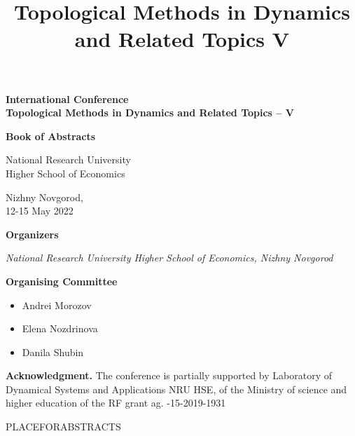 \documentclass[11pt]{combine}
\title{Topological Methods in Dynamics and Related Topics V}
\begin{document}
	\pagestyle{combine}\thispagestyle{empty}
	
	\begin{titlepage}
		\large
		\begin{center}
			{\bf\Large International Conference \\
				\smallskip
				Topological Methods in Dynamics and Related Topics – V}
		\end{center}
		\vspace*{2cm}
		
		
		\vspace{3.cm}
		
		\centerline{\bf\LARGE Book of Abstracts}
		
		
		\vspace{6cm}
		
		
		\begin{center}{\Large National Research University}\\ {\Large Higher School of Economics}\\
		\end{center}
		
		\vspace{3cm}
		
		\begin{center}{Nizhny Novgorod,\\ 12-15 May 2022}\end{center}
		
	\end{titlepage}
	
	{\Large\bf Organizers}
	
	\vspace{7mm}
	{\it
		National Research University Higher School of Economics, Nizhny Novgorod
	}
	\vspace{10mm}
	
	
	{\bf Organising Committee}
	\begin{itemize}
		\setlength{\itemsep}{1pt}%
		\setlength{\parskip}{1pt}
		\item Andrei Morozov
		\item Elena Nozdrinova
		\item Danila Shubin
	\end{itemize}
	
	
	{\bf Acknowledgment.} The conference is partially supported by Laboratory of Dynamical
	Systems and Applications NRU HSE, of the Ministry of science and higher education of
	the RF grant ag. -15-2019-1931
	
	\clearpage
	\setcounter{page}{3}
	\tableofcontents %
	\clearpage
	
	
	
	\begin{papers}
		
		\let\clearpage\relax
		
		PLACEFORABSTRACTS
		
	\end{papers}
	
\end{document}
